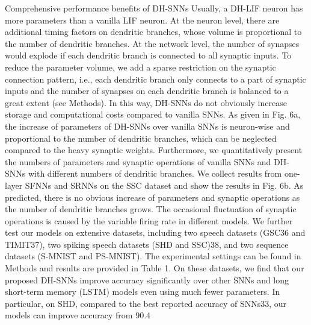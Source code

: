 Comprehensive performance benefits of DH-SNNs
Usually, a DH-LIF neuron has more parameters than a vanilla LIF neuron. At the neuron level, there are additional timing factors on dendritic branches, whose volume is proportional to the number of dendritic branches. At the network level, the number of synapses would explode if each dendritic branch is connected to all synaptic inputs. To reduce the parameter volume, we add a sparse restriction on the synaptic connection pattern, i.e., each dendritic branch only connects to a part of synaptic inputs and the number of synapses on each dendritic branch is balanced to a great extent (see Methods). In this way, DH-SNNs do not obviously increase storage and computational costs compared to vanilla SNNs. As given in Fig. 6a, the increase of parameters of DH-SNNs over vanilla SNNs is neuron-wise and proportional to the number of dendritic branches, which can be neglected compared to the heavy synaptic weights. Furthermore, we quantitatively present the numbers of parameters and synaptic operations of vanilla SNNs and DH-SNNs with different numbers of dendritic branches. We collect results from one-layer SFNNs and SRNNs on the SSC dataset and show the results in Fig. 6b. As predicted, there is no obvious increase of parameters and synaptic operations as the number of dendritic branches grows. The occasional fluctuation of synaptic operations is caused by the variable firing rate in different models. We further test our models on extensive datasets, including two speech datasets (GSC36 and TIMIT37), two spiking speech datasets (SHD and SSC)38, and two sequence datasets (S-MNIST and PS-MNIST). The experimental settings can be found in Methods and results are provided in Table 1. On these datasets, we find that our proposed DH-SNNs improve accuracy significantly over other SNNs and long short-term memory (LSTM) models even using much fewer parameters. In particular, on SHD, compared to the best reported accuracy of SNNs33, our models can improve accuracy from 90.4%

